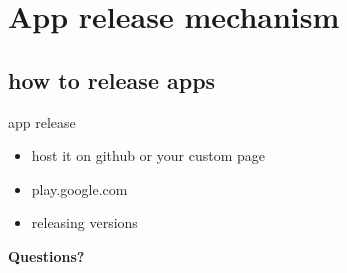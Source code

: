 \documentclass{beamer}
\begin{document}
\section{App release mechanism}
\subsection{how to release apps}
\begin{frame}{app release}
    \begin{itemize}
    \item host it on github or your custom page
    \item play.google.com
    \item releasing versions
    \end{itemize}
\end{frame}

\begin{frame}{}
  \centerline{\bf Questions?}
\end{frame}
\end{document}
